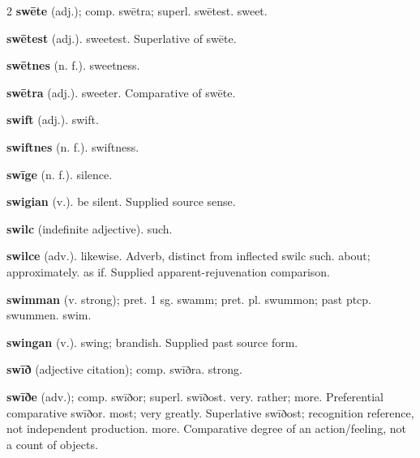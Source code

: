 \begin{multicols*}{2}
\textbf{swēte} (adj.); comp. swētra; superl. swētest. sweet.\par
\textbf{swētest} (adj.). sweetest. Superlative of swēte.\par
\textbf{swētnes} (n. f.). sweetness.\par
\textbf{swētra} (adj.). sweeter. Comparative of swēte.\par
\textbf{swift} (adj.). swift.\par
\textbf{swiftnes} (n. f.). swiftness.\par
\textbf{swīge} (n. f.). silence.\par
\textbf{swigian} (v.). be silent. Supplied source sense.\par
\textbf{swilc} (indefinite adjective). such.\par
\textbf{swilce} (adv.). likewise. Adverb, distinct from inflected swilc such. about; approximately. as if. Supplied apparent-rejuvenation comparison.\par
\textbf{swimman} (v. strong); pret. 1 sg. swamm; pret. pl. swummon; past ptcp. swummen. swim.\par
\textbf{swingan} (v.). swing; brandish. Supplied past source form.\par
\textbf{swīð} (adjective citation); comp. swīðra. strong.\par
\textbf{swīðe} (adv.); comp. swīðor; superl. swīðost. very. rather; more. Preferential comparative swīðor. most; very greatly. Superlative swīðost; recognition reference, not independent production. more. Comparative degree of an action/feeling, not a count of objects.\par

\end{multicols*}
